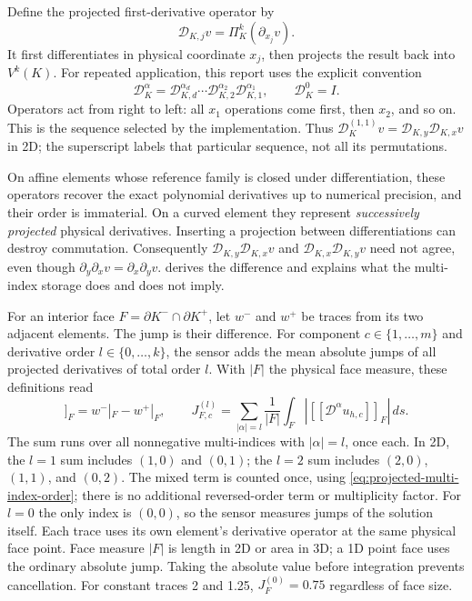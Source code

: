 Define the projected first-derivative operator by
\begin{equation}
 \mathscr D_{K,j}v=\Pi_K^k(\partial_{x_j}v).
 \label{eq:projected-first-derivative}
\end{equation}
It first differentiates in physical coordinate $x_j$, then projects the result
back into $V^k(K)$. For repeated application, this report uses the explicit
convention
\begin{equation}
 \mathscr D_K^\alpha
 =\mathscr D_{K,d}^{\alpha_d}\cdots
   \mathscr D_{K,2}^{\alpha_2}\mathscr D_{K,1}^{\alpha_1},
 \qquad \mathscr D_K^0=I.
 \label{eq:projected-multi-index-order}
\end{equation}
Operators act from right to left: all $x_1$ operations come first, then
$x_2$, and so on. This is the sequence selected by the implementation.
Thus $\mathscr D_K^{(1,1)}v=\mathscr D_{K,y}\mathscr D_{K,x}v$ in 2D;
the superscript labels that particular sequence, not all its permutations.

On affine elements whose reference family is closed under differentiation,
these operators recover the exact polynomial derivatives up to numerical
precision, and their order is immaterial. On a curved element they represent
\emph{successively projected} physical derivatives. Inserting a projection
between differentiations can destroy commutation. Consequently
$\mathscr D_{K,y}\mathscr D_{K,x}v$ and
$\mathscr D_{K,x}\mathscr D_{K,y}v$ need not agree, even though
$\partial_y\partial_xv=\partial_x\partial_yv$.
 derives the difference and explains
what the multi-index storage does and does not imply.

For an interior face $F=\partial K^-\cap\partial K^+$, let $w^-$ and
$w^+$ be traces from its two adjacent elements. The jump is their difference.
For component $c\in\{1,\ldots,m\}$ and derivative order
$l\in\{0,\ldots,k\}$, the sensor adds the mean absolute jumps of all
projected derivatives of total order $l$. With $|F|$ the physical face
measure, these definitions read
\begin{equation}
 [\![w]\!]_F=w^-|_F-w^+|_F,
 \qquad
 J_{F,c}^{(l)}=\sum_{|\alpha|=l}\frac1{|F|}\int_F
 \left|[\![\mathscr D^\alpha u_{h,c}]\!]_F\right|\,ds.
 \label{eq:ofdg-face-jump}
\end{equation}
The sum runs over
all nonnegative multi-indices with $|\alpha|=l$, once each. In 2D, the
$l=1$ sum includes $(1,0)$ and $(0,1)$; the $l=2$ sum includes $(2,0)$,
$(1,1)$, and $(0,2)$. The mixed term is counted once, using
\cref{eq:projected-multi-index-order}; there is no additional reversed-order
term or multiplicity factor. For $l=0$ the only index is $(0,0)$, so the
sensor measures jumps of the solution itself. Each trace uses its own
element's derivative operator at the same physical face point. Face measure $|F|$ is
length in 2D or area in 3D; a 1D point face uses the ordinary absolute jump.
Taking the absolute value before integration prevents cancellation. For
constant traces 2 and 1.25, $J_F^{(0)}=0.75$ regardless of face size.


